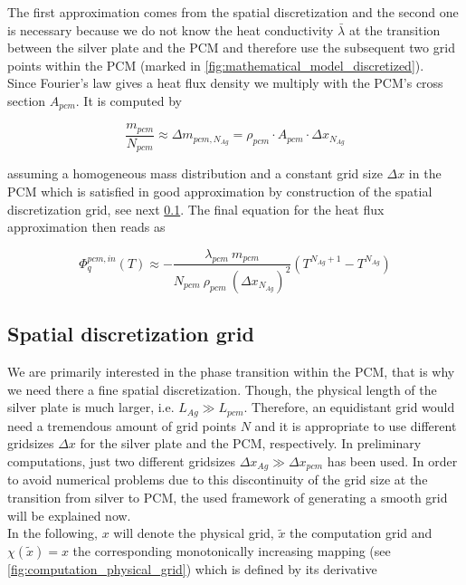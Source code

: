 \documentclass{scrartcl}[12pt, halfparskip]
\numberwithin{equation}{section}
\numberwithin{figure}{section}
\numberwithin{table}{section}
\begin{document}
The first approximation comes from the spatial discretization and the second one is necessary because we do not know the heat conductivity $\bar{\lambda}$ at the transition between the silver plate and the PCM and therefore use the subsequent two grid points within the PCM (marked in \cref{fig:mathematical_model_discretized}). \\
Since Fourier's law gives a heat flux density we multiply with the PCM's cross section $A_{pcm}$. It is computed by

\begin{equation}
	\frac{m_{pcm}}{N_{pcm}} \approx \Delta m_{pcm,N_{Ag}} = \rho_{pcm} \cdot A_{pcm} \cdot \Delta x_{N_{Ag}}
\end{equation}

assuming a homogeneous mass distribution and a constant grid size $\Delta x$ in the PCM which is satisfied in good approximation by construction of the spatial discretization grid, see next \cref{sec:spatial_discretization_grid}. The final equation for the heat flux approximation then reads as

\begin{equation}
	\varPhi_{q}^{pcm,in}(T) \approx - \frac{\lambda_{pcm} \ m_{pcm}}{N_{pcm} \ \rho_{pcm} \ (\Delta x_{N_{Ag}})^2} \left( T^{N_{Ag}+1} - T^{N_{Ag}} \right)
	\label{eq:heat_flux_computation_final}
\end{equation}



\subsection{Spatial discretization grid}
\label{sec:spatial_discretization_grid}

We are primarily interested in the phase transition within the PCM, that is why we need there a fine spatial discretization. Though, the physical length of the silver plate is much larger, i.e. $L_{Ag} \gg L_{pcm}$. Therefore, an equidistant grid would need a tremendous amount of grid points $N$ and it is appropriate to use different gridsizes $\Delta x$ for the silver plate and the PCM, respectively. In preliminary computations, just two different gridsizes $\Delta x_{Ag} \gg \Delta x_{pcm}$ has been used. In order to avoid numerical problems due to this discontinuity of the grid size at the transition from silver to PCM, the used framework of generating a smooth grid will be explained now. \\
In the following, $x$ will denote the physical grid, $\tilde{x}$ the computation grid and $\chi(\tilde{x}) = x$ the corresponding monotonically increasing mapping (see \cref{fig:computation_physical_grid}) which is defined by its derivative
\end{document}
